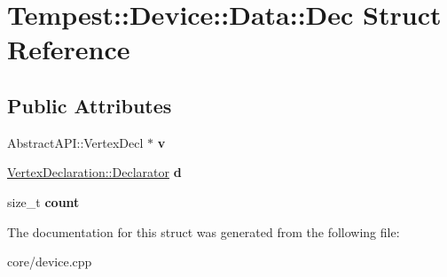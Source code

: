 \hypertarget{struct_device_1_1_data_1_1_dec}{\section{Tempest\+:\+:Device\+:\+:Data\+:\+:Dec Struct Reference}
\label{struct_device_1_1_data_1_1_dec}
}
\subsection*{Public Attributes}
\begin{DoxyCompactItemize}
\item 
\hypertarget{struct_device_1_1_data_1_1_dec_adb09bcd36eea84b306941d3facb2e772}{Abstract\+A\+P\+I\+::\+Vertex\+Decl $\ast$ {\bfseries v}}\label{struct_device_1_1_data_1_1_dec_adb09bcd36eea84b306941d3facb2e772}

\item 
\hypertarget{struct_device_1_1_data_1_1_dec_a403d3814a595a0da1a4ee0b311ceb1dc}{\hyperlink{class_tempest_1_1_vertex_declaration_1_1_declarator}{Vertex\+Declaration\+::\+Declarator} {\bfseries d}}\label{struct_device_1_1_data_1_1_dec_a403d3814a595a0da1a4ee0b311ceb1dc}

\item 
\hypertarget{struct_device_1_1_data_1_1_dec_ab36cd33b08c5b046a02cd14720e92d6a}{size\+\_\+t {\bfseries count}}\label{struct_device_1_1_data_1_1_dec_ab36cd33b08c5b046a02cd14720e92d6a}

\end{DoxyCompactItemize}


The documentation for this struct was generated from the following file\+:\begin{DoxyCompactItemize}
\item 
core/device.\+cpp\end{DoxyCompactItemize}
